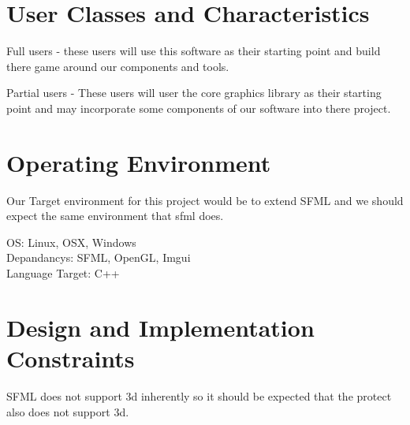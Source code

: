 \documentclass{scrreprt}
\begin{document}
\section{User Classes and Characteristics}

Full users - these users will use this software as their starting point and build there game around our components and tools.

Partial users - These users will user the core graphics library as their starting point and may incorporate some components of our software into there project. 


\section{Operating Environment}

Our Target environment for this project would be to extend SFML and we should expect the same environment that sfml does.

OS: Linux, OSX, Windows\\
Depandancys: SFML, OpenGL, Imgui\\
Language Target: C++\\



\section{Design and Implementation Constraints}
SFML does not support 3d inherently so it should be expected that the protect also does not  support 3d.

\end{document}
